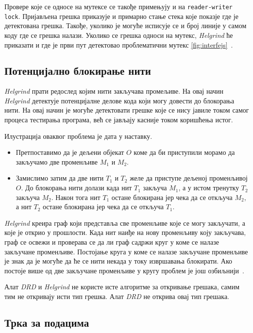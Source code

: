 \documentclass[12pt,oneside]{memoir}
\begin{document}
\indent Провере које се односе на мутексе се такође примењују и на \texttt{reader-writer lock}. Пријављена грешка приказује и примарно стање стека које показје где је детектована грешка. Такође, уколико је могуће исписује се и број линије у самом коду где се грешка налази. Уколико се грешка односи на мутекс, \textit{Helgrind} ће приказати и где је први пут детектовао проблематични мутекс \ref{fig:interfejs}~\cite{helgrindRef}.

\subsection{Потенцијално блокирање нити}

\indent \textit{Helgrind} прати редослед којим нити закључава промељиве. На овај начин \textit{Helgrind} детектује потенцијалне делове кода који могу довести до блокорања нити. На овај начин је могуће детектовати грешке које се нису јавиле током самог процеса тестирања програма, већ се јављају касније током коришћења истог.

\indent Илустрација оваквог проблема је дата у наставку.

\begin{itemize}
  \item Претпоставимо да је дељени објекат $O$ коме да би приступили морамо да закључамо две променљиве $M_1$ и $M_2$.
  \item  Замислимо затим да две нити $T_1$ и $T_2$ желе да приступе дељеној променљивој $O$. До блокорања нити долази када нит $T_1$ закључа $M_1$, а у истом тренутку $T_2$ закључа $M_2$. Након тога нит $T_1$ остане блокирана јер чека да се откључа $M_2$, а нит $T_2$ остане блокирана јер чека да се откључа $T_1$.
\end{itemize}


\indent \textit{Helgrind} креира граф који представља све променљиве које се могу закључати, а које је открио у прошлости. Када нит наиђе на нову променљиву коју закључава, граф се освежи и проверава се да ли граф садржи круг у коме се налазе закључане променљиве. Постојање круга у коме се налазе закључане променљиве је знак да је могуће да ће се нити некада у току извршавања блокирати. Ако постоје више од две закључане променљиве у кругу проблем је још озбиљнији~\cite{helgrindRef}.

\indent Алат \textit{DRD} и \textit{Helgrind} не користе исте алгоритме за откривање грешака, самим тим не откривају исти тип грешка. Алат \textit{DRD} не открива овај тип грешака.


\subsection{Трка за подацима}
\end{document}
